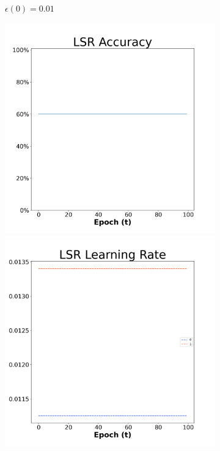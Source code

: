 \begin{figure}[H]
\begin{subfigure}{0.3\textwidth}
  \caption{$\epsilon(0)=0.01$}
\end{subfigure}\hfil %
\begin{subfigure}{0.3\textwidth}
  \includegraphics[width=\linewidth]{images/exper1/NSP/LSR_0.03_acc.png}
  \includegraphics[width=\linewidth]{images/exper1/NSP/LSR_0.03_lr.png}

\end{subfigure}
\end{figure}

